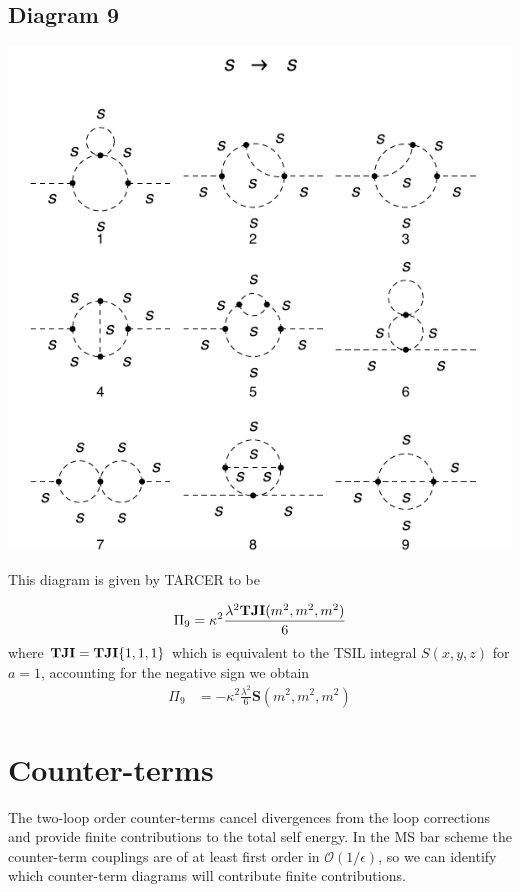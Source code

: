 \documentclass[11pt]{article}
\begin{document}
\subsection*{Diagram 9}
\begin{center}
\includegraphics{2loop_9.pdf}
\end{center}
This diagram is given by TARCER to be

 \begin{align}
 \Pi_9 =\kappa^2 \frac{\lambda^2 {\tt{\mathbf{TJI}}}(m^2,m^2,m^2) }{6}
 \end{align}
 where ${\tt{\mathbf{TJI}}} = {\tt{\mathbf{TJI}}}\{1,1,1\}$ which is equivalent to the TSIL integral $S(x,y,z)$ for $a=1$, accounting for the negative sign we obtain
 \begin{align*}
 \Pi_9 & = -\kappa^2\frac{\lambda^2}{6}\textbf{S}(m^2,m^2,m^2)
 \end{align*}
 
 
 
 \section*{Counter-terms}
 
 
 The two-loop order counter-terms cancel divergences from the loop corrections and provide finite contributions to the total self energy.  In the MS bar scheme the counter-term couplings are of at least first order in $\mathcal{O}(1/\epsilon)$, so we can identify which counter-term diagrams will contribute finite contributions.
 
\end{document}
